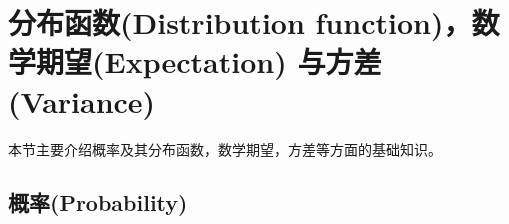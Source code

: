 
\section{ 分布函数(Distribution function)，数学期望(Expectation) 与方差(Variance)}

本节主要介绍概率及其分布函数，数学期望，方差等方面的基础知识。

\subsection{ 概率(Probability)}

